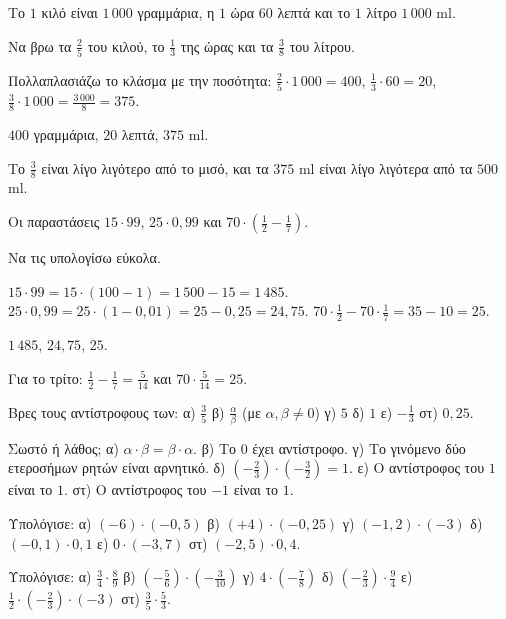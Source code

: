 \tixero Το $1$ κιλό είναι $1\,000$ γραμμάρια, η $1$ ώρα $60$ λεπτά και το $1$ λίτρο $1\,000$ ml.\par
\tithelo Να βρω τα $\frac{2}{5}$ του κιλού, το $\frac{1}{3}$ της ώρας και τα $\frac{3}{8}$ του λίτρου.\par
\possindeo Πολλαπλασιάζω το κλάσμα με την ποσότητα: $\frac{2}{5}\cdot1\,000=400$, $\frac{1}{3}\cdot60=20$, $\frac{3}{8}\cdot1\,000=\frac{3\,000}{8}=375$.\par
\apantisi $400$ γραμμάρια, $20$ λεπτά, $375$ ml.\par
\elegxos Το $\frac{3}{8}$ είναι λίγο λιγότερο από το μισό, και τα $375$ ml είναι λίγο λιγότερα από τα $500$ ml.

\tixero Οι παραστάσεις $15\cdot99$, $25\cdot0{,}99$ και $70\cdot\left(\frac{1}{2}-\frac{1}{7}\right)$.\par
\tithelo Να τις υπολογίσω εύκολα.\par
\possindeo $15\cdot99=15\cdot(100-1)=1\,500-15=1\,485$. $25\cdot0{,}99=25\cdot(1-0{,}01)=25-0{,}25=24{,}75$. $70\cdot\frac{1}{2}-70\cdot\frac{1}{7}=35-10=25$.\par
\apantisi $1\,485$, $24{,}75$, $25$.\par
\elegxos Για το τρίτο: $\frac{1}{2}-\frac{1}{7}=\frac{5}{14}$ και $70\cdot\frac{5}{14}=25$.



\ex Βρες τους αντίστροφους των: α) $\frac{3}{5}$ \quad β) $\frac{\alpha}{\beta}$ (με $\alpha,\beta\neq0$) \quad γ) $5$ \quad δ) $1$ \quad ε) $-\frac{1}{3}$ \quad στ) $0{,}25$.

\ex Σωστό ή λάθος; α) $\alpha\cdot\beta=\beta\cdot\alpha$. \quad β) Το $0$ έχει αντίστροφο. \quad γ) Το γινόμενο δύο ετεροσήμων ρητών είναι αρνητικό. \quad δ) $\left(-\frac{2}{3}\right)\cdot\left(-\frac{3}{2}\right)=1$. \quad ε) Ο αντίστροφος του $1$ είναι το $1$. \quad στ) Ο αντίστροφος του $-1$ είναι το $1$.

\ex Υπολόγισε: α) $(-6)\cdot(-0{,}5)$ \quad β) $(+4)\cdot(-0{,}25)$ \quad γ) $(-1{,}2)\cdot(-3)$ \quad δ) $(-0{,}1)\cdot0{,}1$ \quad ε) $0\cdot(-3{,}7)$ \quad στ) $(-2{,}5)\cdot0{,}4$.

\ex Υπολόγισε: α) $\frac{3}{4}\cdot\frac{8}{9}$ \quad β) $\left(-\frac{5}{6}\right)\cdot\left(-\frac{3}{10}\right)$ \quad γ) $4\cdot\left(-\frac{7}{8}\right)$ \quad δ) $\left(-\frac{2}{3}\right)\cdot\frac{9}{4}$ \quad ε) $\frac{1}{2}\cdot\left(-\frac{2}{3}\right)\cdot(-3)$ \quad στ) $\frac{3}{5}\cdot\frac{5}{3}$.


